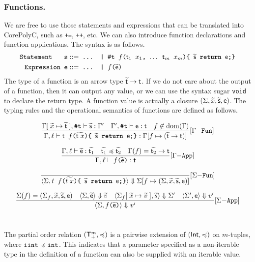 \documentclass[runningheads]{llncs}
\begin{document}
\subsubsection{Functions.}
We are free to use those statements and expressions that can be translated into CorePolyC, such as \texttt{+=}, \texttt{++}, etc.
We can also introduce function declarations and function applications. 
The syntax is as follows.
\begin{align*}
    \texttt{Statement\quad\, s}::=&\texttt{ ... | $\t$ $f$($\tt_1$ $x_1$, $\dots$ $\tt_m$ $x_m$)\{ $\widetilde{\s}$ \textbf{return} $\e$;\}}\\
    \texttt{Expression e}::=&\texttt{ ... | $f$($\widetilde{\e}$)}
\end{align*}
The type of a function is an arrow type $\widetilde{\tt} \to \tt$.
If we do not care about the output of a function, then it can output any value, or we can use the syntax sugar \texttt{void} to declare the return type.
A function value is actually a closure $(\Sigma, \widetilde{x}, \widetilde{\s}, \e)$.
The typing rules and the operational semantics of functions are defined as follows.
{
\small
\[\trule{\typing{\Gamma[\;\widetilde{x}\mapsto\widetilde{\tt}\;]}{\t}{\widetilde{\s}}{\Gamma'}\quad \typing{\Gamma'}{\t}{\e}{\tt}\quad f\not\in\dom(\Gamma)}{\typing{\Gamma}{\l}{\texttt{$\tt$ $f$($\widetilde{\tt\;x}$)\{ $\widetilde{\s}$ \textbf{return} $\e$;\}}}{\Gamma[f\mapsto (\widetilde{\tt}\to \tt)]}}{Fun}\]

\[\trule{\typing{\Gamma}{\l}{\widetilde{\e}}{\widetilde{\tt_1}}\quad\widetilde{\tt_1}\preccurlyeq\widetilde{\tt_2}\quad \Gamma(f)=\widetilde{\tt_2}\to \tt}{\typing{\Gamma}{\l}{\texttt{$f$($\widetilde{\e}$)}}{\tt}}{App}\]

\[\srule{}{\semantics{\Sigma}{\texttt{$t$ $f$($\widetilde{t\;x}$)\{ $\widetilde{\s}$ \textbf{return} $\e$;\}}}{\Sigma[f\mapsto(\Sigma,\widetilde{x},\widetilde{\s},\e)]}}{Fun}\]

\[\srule{\Sigma(f)=(\Sigma_f,\widetilde{x},\widetilde{\s},\e)\quad\semantics{\Sigma}{\widetilde{\e}}{\widetilde{v}}\quad\semantics{\Sigma_f[\;\widetilde{x}\mapsto\widetilde{v}\;]}{\widetilde{s}}{\Sigma'}\quad\semantics{\Sigma'}{\e}{v'}}{\semantics{\Sigma}{\texttt{$f$($\widetilde{\e}$)}}{v'}}{App}\]~
}

\noindent
The partial order relation $(\T_{+}^{m}, \preccurlyeq)$ is a pairwise extension of $(\Int, \preccurlyeq)$ on $m$-tuples, where $\typeIterInt \preccurlyeq \typeInt$.
This indicates that a parameter specified as a non-iterable type in the definition of a function can also be supplied with an iterable value.
\end{document}
